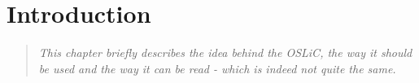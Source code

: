 %
%
%
%
%




\chapter{Introduction}

\footnotesize \begin{quote}\itshape
This chapter briefly describes the idea behind the OSLiC, the way it should be
used and the way it can be read - which is indeed not quite the same.
\end{quote}
\normalsize{}

